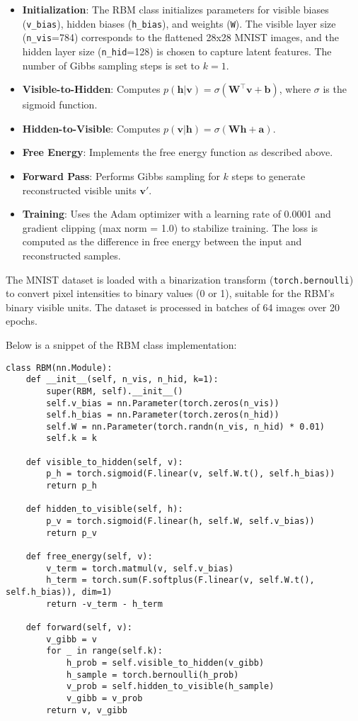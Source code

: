 \documentclass{article}
\begin{document}
\begin{itemize}
    \item \textbf{Initialization}: The RBM class initializes parameters for visible biases (\texttt{v\_bias}), hidden biases (\texttt{h\_bias}), and weights (\texttt{W}). The visible layer size (\texttt{n\_vis}=784) corresponds to the flattened 28x28 MNIST images, and the hidden layer size (\texttt{n\_hid}=128) is chosen to capture latent features. The number of Gibbs sampling steps is set to \( k=1 \).
    \item \textbf{Visible-to-Hidden}: Computes \( p(\mathbf{h}|\mathbf{v}) = \sigma(\mathbf{W}^\top \mathbf{v} + \mathbf{b}) \), where \( \sigma \) is the sigmoid function.
    \item \textbf{Hidden-to-Visible}: Computes \( p(\mathbf{v}|\mathbf{h}) = \sigma(\mathbf{W} \mathbf{h} + \mathbf{a}) \).
    \item \textbf{Free Energy}: Implements the free energy function as described above.
    \item \textbf{Forward Pass}: Performs Gibbs sampling for \( k \) steps to generate reconstructed visible units \( \mathbf{v}' \).
    \item \textbf{Training}: Uses the Adam optimizer with a learning rate of 0.0001 and gradient clipping (max norm = 1.0) to stabilize training. The loss is computed as the difference in free energy between the input and reconstructed samples.
\end{itemize}

The MNIST dataset is loaded with a binarization transform (\texttt{torch.bernoulli}) to convert pixel intensities to binary values (0 or 1), suitable for the RBM's binary visible units. The dataset is processed in batches of 64 images over 20 epochs.

Below is a snippet of the RBM class implementation:

\begin{lstlisting}
class RBM(nn.Module):
    def __init__(self, n_vis, n_hid, k=1):
        super(RBM, self).__init__()
        self.v_bias = nn.Parameter(torch.zeros(n_vis))
        self.h_bias = nn.Parameter(torch.zeros(n_hid))
        self.W = nn.Parameter(torch.randn(n_vis, n_hid) * 0.01)
        self.k = k

    def visible_to_hidden(self, v):
        p_h = torch.sigmoid(F.linear(v, self.W.t(), self.h_bias))
        return p_h

    def hidden_to_visible(self, h):
        p_v = torch.sigmoid(F.linear(h, self.W, self.v_bias))
        return p_v

    def free_energy(self, v):
        v_term = torch.matmul(v, self.v_bias)
        h_term = torch.sum(F.softplus(F.linear(v, self.W.t(), self.h_bias)), dim=1)
        return -v_term - h_term

    def forward(self, v):
        v_gibb = v
        for _ in range(self.k):
            h_prob = self.visible_to_hidden(v_gibb)
            h_sample = torch.bernoulli(h_prob)
            v_prob = self.hidden_to_visible(h_sample)
            v_gibb = v_prob
        return v, v_gibb
\end{lstlisting}
\end{document}
